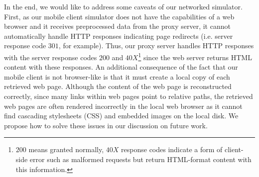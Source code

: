 In the end, we would like to address some caveats of our networked simulator. First, as our mobile client simulator does not have the capabilities of a web browser and it receives preprocessed data from the proxy server, it cannot automatically handle HTTP responses indicating page redirects (i.e. server response code $301$, for example). Thus, our proxy server handles HTTP responses with the server response codes $200$ and $40X$\footnote{$200$ means granted normally, $40X$ response codes indicate a form of client-side error such as malformed requests but return HTML-format content with this information.} since the web server returns HTML content with these responses. An additional consequence of the fact that our mobile client is not browser-like is that it must create a local copy of each retrieved web page. Although the content of the web page is reconstructed correctly, since many links within web pages point to relative paths, the retrieved web pages are often rendered incorrectly in the local web browser as it cannot find cascading stylesheets (CSS) and embedded images on the local disk. We propose how to solve these issues in our discussion on future work.
